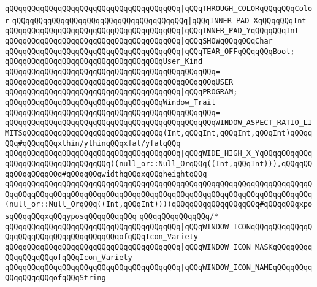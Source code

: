 \verb|qQQqqQQqqQQqqQQqqQQqqQQqqQQqqQQqqQQqqQQq|\verb#|qQQqTHROUGH_COLORqQQqqQQqColor#\newline
\verb|qQQqqQQqqQQqqQQqqQQqqQQqqQQqqQQqqQQqqQQq|\verb#|qQQqINNER_PAD_XqQQqqQQqInt#\newline
\verb|qQQqqQQqqQQqqQQqqQQqqQQqqQQqqQQqqQQqqQQq|\verb#|qQQqINNER_PAD_YqQQqqQQqInt#\newline
\verb|qQQqqQQqqQQqqQQqqQQqqQQqqQQqqQQqqQQqqQQq|\verb#|qQQqSHOWqQQqqQQqChar#\newline
\verb|qQQqqQQqqQQqqQQqqQQqqQQqqQQqqQQqqQQqqQQq|\verb#|qQQqTEAR_OFFqQQqqQQqBool;#\newline
\newline
\verb|qQQqqQQqqQQqqQQqqQQqqQQqqQQqqQQqqQQqUser_Kind|\newline
\verb|qQQqqQQqqQQqqQQqqQQqqQQqqQQqqQQqqQQqqQQqqQQqqQQq=|\newline
\verb|qQQqqQQqqQQqqQQqqQQqqQQqqQQqqQQqqQQqqQQqqQQqqQQqUSER|\newline
\verb|qQQqqQQqqQQqqQQqqQQqqQQqqQQqqQQqqQQqqQQq|\verb#|qQQqPROGRAM;#\newline
\newline
\verb|qQQqqQQqqQQqqQQqqQQqqQQqqQQqqQQqqQQqWindow_Trait|\newline
\verb|qQQqqQQqqQQqqQQqqQQqqQQqqQQqqQQqqQQqqQQqqQQqqQQq=|\newline
\verb|qQQqqQQqqQQqqQQqqQQqqQQqqQQqqQQqqQQqqQQqqQQqqQQqWINDOW_ASPECT_RATIO_LIMITSqQQqqQQqqQQqqQQqqQQqqQQqqQQqqQQq(Int,qQQqInt,qQQqInt,qQQqInt)qQQqqQQq#qQQqqQQqxthin/ythinqQQqxfat/yfatqQQq|\newline
\verb|qQQqqQQqqQQqqQQqqQQqqQQqqQQqqQQqqQQqqQQq|\verb#|qQQqWIDE_HIGH_X_YqQQqqQQqqQQqqQQqqQQqqQQqqQQqqQQqqQQq((null_or::Null_OrqQQq((Int,qQQqInt))),qQQqqQQqqQQqqQQqqQQq#\verb|#qQQqqQQqwidthqQQqxqQQqheightqQQq|\newline
\verb|qQQqqQQqqQQqqQQqqQQqqQQqqQQqqQQqqQQqqQQqqQQqqQQqqQQqqQQqqQQqqQQqqQQqqQQqqQQqqQQqqQQqqQQqqQQqqQQqqQQqqQQqqQQqqQQqqQQqqQQqqQQqqQQqqQQqqQQqqQQq(null_or::Null_OrqQQq((Int,qQQqInt))))qQQqqQQqqQQqqQQqqQQq#qQQqqQQqxposqQQqqQQqxqQQqyposqQQqqQQqqQQq|\newline
\verb|qQQqqQQqqQQqqQQq/*|\newline
\verb|qQQqqQQqqQQqqQQqqQQqqQQqqQQqqQQqqQQqqQQq|\verb#|qQQqWINDOW_ICONqQQqqQQqqQQqqQQqqQQqqQQqqQQqqQQqqQQqqQQqofqQQqIcon_Variety#\newline
\verb|qQQqqQQqqQQqqQQqqQQqqQQqqQQqqQQqqQQqqQQq|\verb#|qQQqWINDOW_ICON_MASKqQQqqQQqqQQqqQQqqQQqofqQQqIcon_Variety#\newline
\verb|qQQqqQQqqQQqqQQqqQQqqQQqqQQqqQQqqQQqqQQq|\verb#|qQQqWINDOW_ICON_NAMEqQQqqQQqqQQqqQQqqQQqofqQQqString#\newline
